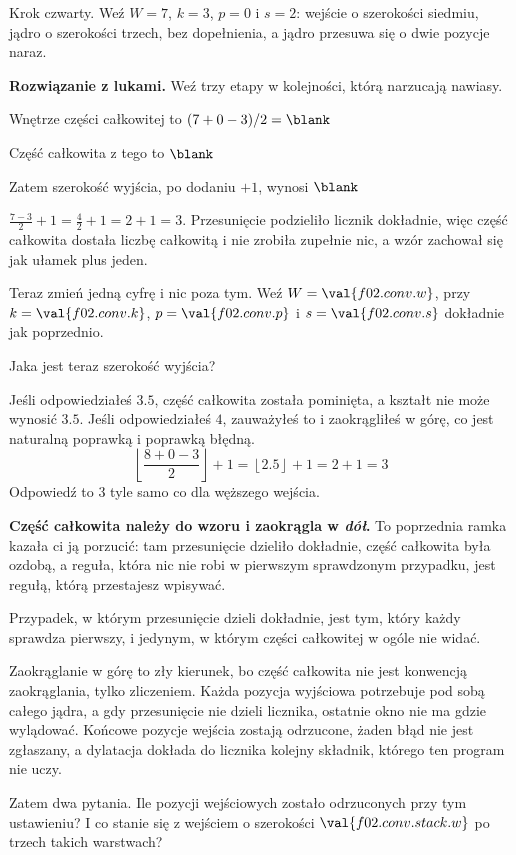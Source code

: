 \begin{fr}
Krok czwarty. Weź $W = 7$, $k = 3$, $p = 0$ i $s = 2$: wejście o szerokości
siedmiu, jądro o szerokości trzech, bez dopełnienia, a jądro przesuwa się o dwie
pozycje naraz.

\textbf{Rozwiązanie z lukami.} Weź trzy etapy w kolejności, którą narzucają
nawiasy.

Wnętrze części całkowitej to $(7 + 0 - 3)/2 = \blank$

Część całkowita z tego to $\blank$

Zatem szerokość wyjścia, po dodaniu $+ 1$, wynosi $\blank$
\dotline
\nextframe
\end{fr}

\begin{fr}
$\frac{7 - 3}{2} + 1 = \frac{4}{2} + 1 = 2 + 1 = 3$. Przesunięcie podzieliło
licznik dokładnie, więc część całkowita dostała liczbę całkowitą i nie zrobiła
zupełnie nic, a wzór zachował się jak ułamek plus jeden.

Teraz zmień jedną cyfrę i nic poza tym. Weź $W = \val{f02.conv.w}$, przy
$k = \val{f02.conv.k}$, $p = \val{f02.conv.p}$ i $s = \val{f02.conv.s}$
dokładnie jak poprzednio.

Jaka jest teraz szerokość wyjścia?
\nextframe
\end{fr}

\begin{fr}
\begin{ansblock}
Jeśli odpowiedziałeś $\num{3.5}$, część całkowita została pominięta, a kształt
nie może wynosić $\num{3.5}$. Jeśli odpowiedziałeś $4$, zauważyłeś to i
zaokrągliłeś w górę, co jest naturalną poprawką i poprawką błędną.
\[ \left\lfloor \frac{8 + 0 - 3}{2} \right\rfloor + 1
   = \left\lfloor \num{2.5} \right\rfloor + 1 = 2 + 1 = 3 \]
Odpowiedź to $3$ \dash{} tyle samo co dla węższego wejścia.
\end{ansblock}

\begin{trapbox}
\textbf{Część całkowita należy do wzoru i zaokrągla w \emph{dół}.} To
poprzednia ramka kazała ci ją porzucić: tam przesunięcie dzieliło dokładnie,
część całkowita była ozdobą, a reguła, która nic nie robi w pierwszym sprawdzonym
przypadku, jest regułą, którą przestajesz wpisywać.

Przypadek, w którym przesunięcie dzieli dokładnie, jest tym, który każdy
sprawdza pierwszy, i jedynym, w którym części całkowitej w ogóle nie widać.

Zaokrąglanie w górę to zły kierunek, bo część całkowita nie jest konwencją
zaokrąglania, tylko zliczeniem. Każda pozycja wyjściowa potrzebuje pod sobą
całego jądra, a gdy przesunięcie nie dzieli licznika, ostatnie okno nie ma gdzie
wylądować. Końcowe pozycje wejścia zostają odrzucone, żaden błąd nie jest
zgłaszany, a dylatacja dokłada do licznika kolejny składnik, którego ten
program nie uczy.
\end{trapbox}
Zatem dwa pytania. Ile pozycji wejściowych zostało odrzuconych przy tym
ustawieniu? I co stanie się z wejściem o szerokości
$\val{f02.conv.stack.w}$ po trzech takich warstwach?
\dotline
\nextframe
\end{fr}

